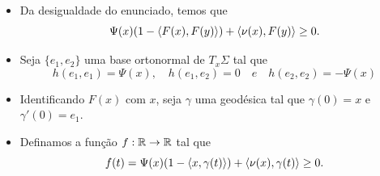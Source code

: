 \documentclass[12pt,a4paper]{beamer}
\theoremstyle{definition}
\begin{document}
\begin{frame}

	\begin{itemize}
		\item Da desigualdade do enunciado, temos que
		\begin{equation*}
		\Psi(x) (1-\left\langle F(x),F(y) \right\rangle) + \left\langle \nu(x),F(y) \right\rangle \geq 0.
		\end{equation*}
		
		\pause
		
		\item Seja $\{ e_1,e_2 \}$ uma base ortonormal de $T_x \Sigma$ tal que
		\begin{equation*}
		h(e_1,e_1)=\Psi(x), \quad h(e_1,e_2)=0 \quad e \quad h(e_2,e_2)=-\Psi(x)
		\end{equation*}
		
		\pause
		
		\item Identificando $F(x)$ com $x$, seja $\gamma$ uma geodésica tal que $\gamma(0)=x$ e $\gamma'(0)=e_1$.
		
		\pause
		
		\item Definamos a função $f: \mathbb R \rightarrow \mathbb R$ tal que
		\begin{equation*}
		f(t) = \Psi(x) (1-\left\langle x,\gamma(t) \right\rangle) + \left\langle \nu(x),\gamma(t) \right\rangle \geq 0.
		\end{equation*}
	
	\end{itemize}

\end{frame}
\end{document}
